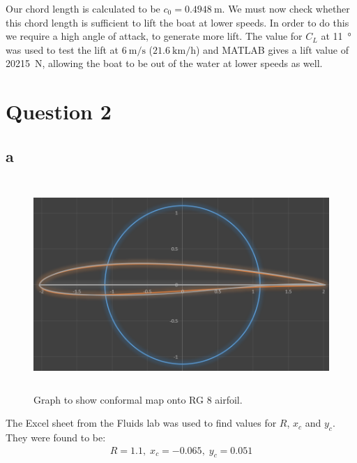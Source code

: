\documentclass[11pt]{article}
\numberwithin{equation}{section}
\begin{document}

Our chord length is calculated to be $c_0 = \SI{0.4948}{\meter}$. We must now check whether this chord length is sufficient to lift the boat at lower speeds. In order to do this we require a high angle of attack, to generate more lift. The value for $C_L$ at \SI{11}{\degree} was used to test the lift at $\SI{6}{\meter\per\second}$ ($\SI{21.6}{\kilo\meter\per\hour}$) and MATLAB gives a lift value of \SI{20215}{\newton}, allowing the boat to be out of the water at lower speeds as well.
\section{Question 2}
\subsection{a}
\begin{figure}[H]
    \centering
    \includegraphics[height = 8cm]{./img/q2a.png}
    \caption{Graph to show conformal map onto RG 8 airfoil.}
    \label{fig:q2a}
\end{figure}
The Excel sheet from the Fluids lab was used to find values for $R$, $x_c$ and $y_c$. They were found to be:
\begin{align}
    R = 1.1, \; x_c = -0.065, \; y_c = 0.051     
\end{align}
\end{document}
